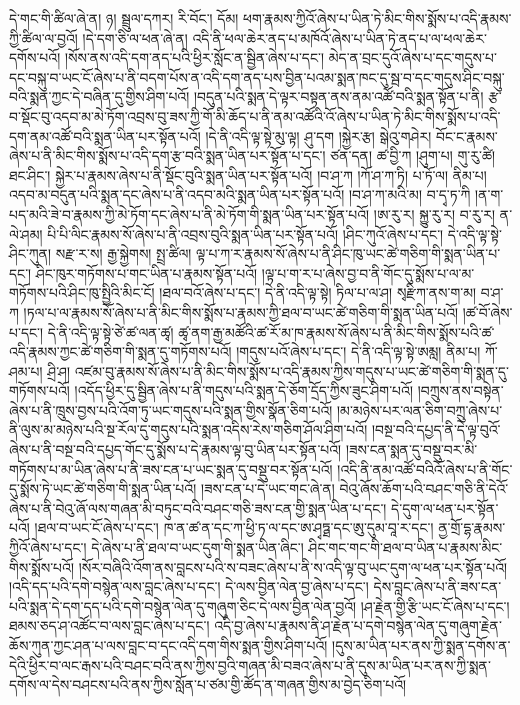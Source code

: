 དེ་གང་གི་ཚིལ་ཞེ་ན། ཉ། སྦྲུལ་དཀར། རི་བོང་། དོམ། ཕག་རྣམས་ཀྱིའོ་ཞེས་པ་ཡིན་ཏེ་མིང་གིས་སྨོས་པ་འདི་རྣམས་ཀྱི་ཚིལ་ལ་བྱའོ། །དེ་དག་ཅི་ལ་ཕན་ཞེ་ན། འདི་ནི་ཕལ་ཆེར་ནད་པ་མཁོའོ་ཞེས་པ་ཡིན་ཏེ་ནད་པ་ལ་ཕལ་ཆེར་དགོས་པའོ། །སོས་ནས་འདི་དག་ནད་པའི་ཕྱིར་སློང་ན་སྦྱིན་ཞེས་པ་དང་། མེད་ན་བྲང་དུའོ་ཞེས་པ་དང་གདུས་པ་དང་བསྐུ་བ་ཡང་ངོ་ཞེས་པ་ནི་བདག་པོས་ན་འདི་དག་ནད་པས་བྱིན་པའམ་སྨན་ཁང་དུ་སྦ་བ་དང་གདུས་ཤིང་བསྐུ་བའི་སྨན་ཀྱང་དེ་བཞིན་དུ་གྱིས་ཤིག་པའོ། །བདུན་པའི་སྨན་དེ་ལྟར་བསྟན་ནས་ནམ་འཚོ་བའི་སྨན་སྟོན་པ་ནི། རྩ་བ་སྡོང་བུ་འདབ་མ་མེ་ཏོག་འབྲས་བུ་ཟས་ཀྱི་གོ་མི་ཆོད་པ་ནི་ནམ་འཚོའི་འོ་ཞེས་པ་ཡིན་ཏེ་མིང་གིས་སྨོས་པ་འདི་དག་ནམ་འཚོ་བའི་སྨན་ཡིན་པར་སྟོན་པའོ། །དེ་ནི་འདི་ལྟ་སྟེ་མུ་ལྟ། ཤུ་དག །སྐྱེར་རྩ། སྒེའུ་གཤེར། བོང་ང་རྣམས་ཞེས་པ་ནི་མིང་གིས་སྨོས་པ་འདི་དག་རྩ་བའི་སྨན་ཡིན་པར་སྟོན་པ་དང་། ཙན་དན། ཚ་བྱི་ཀ །ཤུག་པ། གུ་རུ་ཚི། ཐང་ཤིང་། སྐྱེར་པ་རྣམས་ཞེས་པ་ནི་སྡོང་བུའི་སྨན་ཡིན་པར་སྟོན་པའོ། །བ་ཤ་ཀ །ཀོ་ཤ་ཀ་ཏི། པ་ཏོ་ལ། ནིམ་པ། འདབ་མ་བདུན་པའི་སྨན་དང་ཞེས་པ་ནི་འདབ་མའི་སྨན་ཡིན་པར་སྟོན་པའོ། །བ་ཤ་ཀ་མའི་མ། བ་དྭ་ཏ་ཀི །ན་ག་པད་མའི་ཟེ་བ་རྣམས་ཀྱི་མེ་ཏོག་དང་ཞེས་པ་ནི་མེ་ཏོག་གི་སྨན་ཡིན་པར་སྟོན་པའོ། །ཨ་རུ་ར། སྐྱུ་རུ་ར། བ་རུ་ར། ན་ལེ་ཤམ། པི་པི་ལིང་རྣམས་སོ་ཞེས་པ་ནི་འབྲས་བུའི་སྨན་ཡིན་པར་སྟོན་པའོ། །ཤིང་ཀུའོ་ཞེས་པ་དང་། དེ་འདི་ལྟ་སྟེ་ཤིང་ཀུན། སརྫ་ར་ས། རྒྱ་སྐྱེགས། སྤྲ་ཚིལ། ལྟ་པ་ཀ་ར་རྣམས་སོ་ཞེས་པ་ནི་ཤིང་ཁུ་ཡང་ཚེ་གཅིག་གི་སྨན་ཡིན་པ་དང་། ཤིང་ཁུར་གཏོགས་པ་གང་ཡིན་པ་རྣམས་སྟོན་པའོ། །ལྟ་པ་ག་ར་པ་ཞེས་བྱ་བ་ནི་གོང་དུ་སྨོས་པ་ལ་མ་གཏོགས་པའི་ཤིང་ཁུ་སྤྱིའི་མིང་ངོ། །ཐལ་བའོ་ཞེས་པ་དང་། དེ་ནི་འདི་ལྟ་སྟེ། ཏིལ་པ་ལ་ཤ། སྭརྫིཀ་ནས་ག་མ། བ་ཤ་ཀ །ཏལ་པ་ལ་རྣམས་སོ་ཞེས་པ་ནི་མིང་གིས་སྨོས་པ་རྣམས་ཀྱི་ཐལ་བ་ཡང་ཚེ་གཅིག་གི་སྨན་ཡིན་པའོ། །ཚ་བོ་ཞེས་པ་དང་། དེ་ནི་འདི་ལྟ་སྟེ་ཙེ་ཚ་ལན་ཚྭ། ཚྭ་ནག་རྒྱ་མཚོའི་ཚ་རོ་མ་ཁ་རྣམས་སོ་ཞེས་པ་ནི་མིང་གིས་སྨོས་པའི་ཚ་འདི་རྣམས་ཀྱང་ཚེ་གཅིག་གི་སྨན་དུ་གཏོགས་པའོ། །གདུས་པའོ་ཞེས་པ་དང་། དེ་ནི་འདི་ལྟ་སྟེ་ཨམླ། ནིམ་པ། ཀོ་ཤམ་པ། ཤྲི་ཤ། འཛམ་བུ་རྣམས་སོ་ཞེས་པ་ནི་མིང་གིས་སྨོས་པ་འདི་རྣམས་ཀྱིས་གདུས་པ་ཡང་ཚེ་གཅིག་གི་སྨན་དུ་གཏོགས་པའོ། །འདོད་ཕྱིར་དུ་སྦྱིན་ཞེས་པ་ནི་གདུས་པའི་སྨན་དེ་ཅོག་དྲོད་ཀྱིས་ཟུང་ཤིག་པའོ། །བཀྲུས་ནས་བསྟེན་ཞེས་པ་ནི་ཁྲུས་བྱས་པའི་འོག་ཏུ་ཡང་གདུས་པའི་སྨན་གྱིས་སྣོན་ཅིག་པའོ། །མ་མཉེས་པར་ལན་ཅིག་བཀྲུ་ཞེས་པ་ནི་ལུས་མ་མཉེས་པའི་སྔ་རོལ་དུ་གདུས་པའི་སྨན་འདིས་རེས་གཅིག་ཤོལ་ཤིག་པའོ། །བསྔ་བའི་དཔྱད་ནི་དེ་ལྟ་བུའོ་ཞེས་པ་ནི་བསྔ་བའི་དཔྱད་གོང་དུ་སྨོས་པ་དེ་རྣམས་ལྟ་བུ་ཡིན་པར་སྟོན་པའོ། །ཟས་ངན་སྨན་དུ་བསྡུ་བར་མི་གཏོགས་པ་མ་ཡིན་ཞེས་པ་ནི་ཟས་ངན་པ་ཡང་སྨན་དུ་བསྡུ་བར་སྟོན་པའོ། །འདི་ནི་ནམ་འཚོ་བའིའོ་ཞེས་པ་ནི་གོང་དུ་སྨོས་ཏེ་ཡང་ཚེ་གཅིག་གི་སྨན་ཡིན་པའོ། །ཟས་ངན་པ་དེ་ཡང་གང་ཞེ་ན། བེའུ་ཞོས་ཆོག་པའི་བཤང་གཅི་ནི་དེའོ་ཞེས་པ་ནི་བེའུ་ཞོ་ལས་གཞན་མི་བཏུང་བའི་བཤང་གཅི་ཟས་ངན་གྱི་སྨན་ཡིན་པ་དང་། དེ་དུག་ལ་ཕན་པར་སྟོན་པའོ། །ཐལ་བ་ཡང་ངོ་ཞེས་པ་དང་། ཁ་ན་ཚ་ན་དང་ཀ་ཕྱི་ཏ་ལ་དང་ཨ་ཤྭཏྠ་དང་ཨུ་དུམ་བཱ་ར་དང་། ནྱ་གྲོ་དྷ་རྣམས་ཀྱིའོ་ཞེས་པ་དང་། དེ་ཞེས་པ་ནི་ཐལ་བ་ཡང་དུག་གི་སྨན་ཡིན་ཞིང་། ཤིང་གང་གང་གི་ཐལ་བ་ཡིན་པ་རྣམས་མིང་གིས་སྨོས་པའོ། །སོར་བཞིའི་འོག་ནས་བླངས་པའི་ས་བཟང་ཞེས་པ་ནི་ས་འདི་ལྟ་བུ་ཡང་དུག་ལ་ཕན་པར་སྟོན་པའོ། །འདི་དད་པའི་དགེ་བསྙེན་ལས་བླང་ཞེས་པ་དང་། དེ་ལས་བྱིན་ལེན་བྱ་ཞེས་པ་དང་། དེས་བླང་ཞེས་པ་ནི་ཟས་ངན་པའི་སྨན་དེ་དག་དད་པའི་དགེ་བསྙེན་ལེན་དུ་གཞུག་ཅིང་དེ་ལས་བྱིན་ལེན་བྱའོ། །ཤ་རྗེན་གྱི་རྩི་ཡང་ངོ་ཞེས་པ་དང་། ཐམས་ཅད་ཤ་འཚོང་བ་ལས་བླང་ཞེས་པ་དང་། འདི་བྱ་ཞེས་པ་རྣམས་ནི་ཤ་རྗེན་པ་དགེ་བསྙེན་ལེན་དུ་གཞུག་རྗེན་ཆོས་ཀུན་ཀྱང་ཤན་པ་ལས་བླང་བ་དང་འདི་དག་གིས་སྨན་གྱིས་ཤིག་པའོ། །དུས་མ་ཡིན་པར་ནས་ཀྱི་སྨན་དགོས་ན་དེའི་ཕྱིར་བ་ལང་རྒས་པའི་བཤང་བའི་ནས་ཀྱིས་བྱའི་གཞན་མི་བཟའ་ཞེས་པ་ནི་དུས་མ་ཡིན་པར་ནས་ཀྱི་སྨན་དགོས་ལ་དེས་བཤངས་པའི་ནས་ཀྱིས་སློན་པ་ཙམ་གྱི་ཚོད་ན་གཞན་གྱིས་མ་བྱེད་ཅིག་པའོ། 